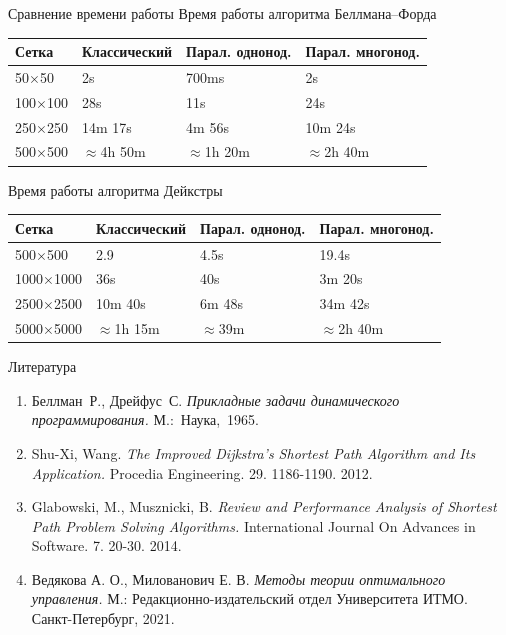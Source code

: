     \begin{frame}[t]{Сравнение времени работы}
        Время работы алгоритма Беллмана--Форда
            \begin{tabular}{ | l | l | l | l |}
                \hline
                Сетка   & Классический    & Парал. однонод. & Парал. многонод. \\ \hline
                50$\times$50   & 2s              & 700ms             & 2s                 \\
                100$\times$100 & 28s             & 11s               & 24s                \\
                250$\times$250 & 14m 17s         & 4m 56s            & 10m 24s             \\
                500$\times$500 & $\approx$4h 50m & $\approx$1h 20m   & $\approx$2h 40m    \\
                \hline
            \end{tabular}
        \vfill 
        Время работы алгоритма Дейкстры
            \begin{tabular}{ | l | l | l | l |}
                \hline
                Сетка     & Классический    & Парал. однонод. & Парал. многонод. \\ \hline
                500$\times$500   & 2.9             & 4.5s              & 19.4s               \\
                1000$\times$1000 & 36s             & 40s               & 3m 20s             \\
                2500$\times$2500 & 10m 40s         & 6m 48s            & 34m 42s            \\
                5000$\times$5000 & $\approx$1h 15m & $\approx$39m      & $\approx$2h 40m    \\
                \hline
            \end{tabular}
    \end{frame}
    \begin{frame}[t]{Литература}
        \begin{enumerate}
            \item Беллман~Р., Дрейфус~С. \textit{Прикладные задачи динамического программирования.} М.:~Наука,~1965.
            \item Shu-Xi, Wang. \textit{The Improved Dijkstra's Shortest Path Algorithm and Its Application.} Procedia Engineering. 29. 1186-1190. 2012.
            \item Glabowski, M., Musznicki, B. \textit{Review and Performance Analysis of Shortest Path Problem Solving Algorithms.} International Journal On Advances in Software. 7. 20-30. 2014.
            \item Ведякова А. О., Милованович Е. В. \textit{Методы теории оптимального управления.} М.: Редакционно-издательский отдел Университета ИТМО. Санкт-Петербург, 2021.
        \end{enumerate}
    \end{frame}

